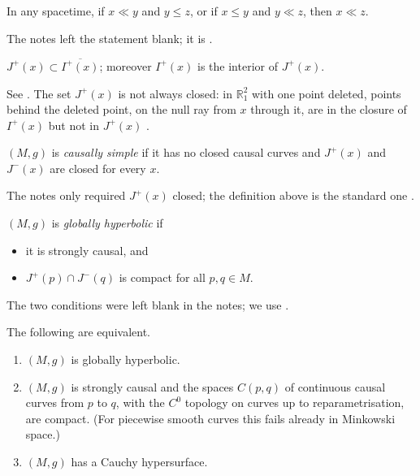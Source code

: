\begin{proposition}[Push-up]
\label{proposition-solis-push-up}
In any spacetime, if $x\ll y$ and
$y\leq z$, or if $x\leq y$ and $y\ll z$,
then $x\ll z$.
\end{proposition}

\noindent
The notes left the statement blank; it is
\cite[Corollary 14.1]{oneill}.

\begin{proposition}
\label{proposition-solis-j-closure}
$J^+(x)\subset\overline{I^+(x)}$; moreover
$I^+(x)$ is the interior of $J^+(x)$.
\end{proposition}

\noindent
See \cite[Lemma 14.6]{oneill}. The set
$J^+(x)$ is not always closed: in
$\mathbb{R}^2_1$ with one point deleted,
points behind the deleted point, on the
null ray from $x$ through it, are in the
closure of $I^+(x)$ but not in $J^+(x)$
\cite[Example 14.4]{oneill}.

\begin{definition}
\label{definition-solis-causally-simple}
$(M,g)$ is \emph{causally simple} if it
has no closed causal curves and $J^+(x)$
and $J^-(x)$ are closed for every $x$.
\end{definition}

\noindent
The notes only required $J^+(x)$ closed;
the definition above is the standard one
\cite{minguzzi2019causality}.

\begin{definition}
\label{definition-solis-globally-hyperbolic}
$(M,g)$ is \emph{globally hyperbolic} if
\begin{itemize}
\item it is strongly causal, and
\item $J^+(p)\cap J^-(q)$ is compact for
all $p,q\in M$.
\end{itemize}
\end{definition}

\noindent
The two conditions were left blank in the
notes; we use
\cite[p.~411]{oneill}.

\begin{proposition}
\label{proposition-solis-gh-equivalent}
The following are equivalent.
\begin{enumerate}
\item $(M,g)$ is globally hyperbolic.
\item $(M,g)$ is strongly causal and the
spaces $C(p,q)$ of continuous causal
curves from $p$ to $q$, with the $C^0$
topology on curves up to
reparametrisation, are compact.
(For piecewise smooth curves this
fails already in Minkowski space.)
\item $(M,g)$ has a Cauchy hypersurface.
\end{enumerate}
\end{proposition}

